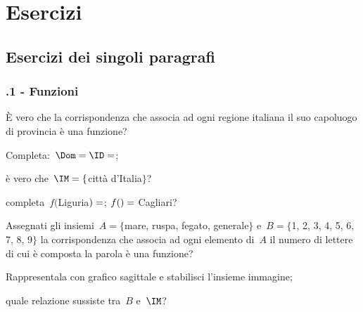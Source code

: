 \section{Esercizi}
\subsection{Esercizi dei singoli paragrafi}
\subsubsection*{\thechapter.1 - Funzioni}
%

\begin{esercizio}
 \label{ese:\thechapter.1}
È vero che la corrispondenza che associa ad ogni regione italiana il suo capoluogo di provincia è una
funzione?

\begin{enumeratea}
\item Completa:~$\Dom = \ID = \dotfill$;
\item è vero che~$\IM = \{$città d'Italia$\}$?
\item completa~$f($Liguria$)=\dotfill$; $f(\dotfill)=$ Cagliari?
\end{enumeratea}
\end{esercizio}

\begin{esercizio}
 \label{ese:\thechapter.2}
Assegnati gli insiemi~$A=\{$mare, ruspa, fegato, generale$\}$ e~$B=\{$1, 2, 3, 4, 5, 6, 7, 8, 9$\}$ la corrispondenza
che associa ad ogni elemento di~$A$ il numero di lettere di cui è
composta la parola è una funzione?

\begin{enumeratea}
\item Rappresentala con grafico sagittale e stabilisci l'insieme immagine;
\item quale relazione sussiste tra~$B$ e~$\IM$?
\end{enumeratea}
\end{esercizio}

